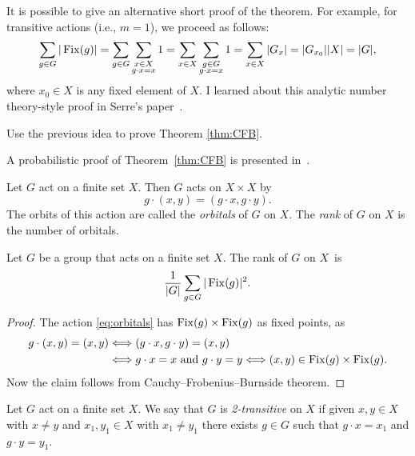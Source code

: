 It is possible to give an alternative short proof of the theorem. For example, 
for transitive actions (i.e., $m=1$), we proceed as follows:
\[
\sum_{g\in G}|\operatorname{Fix}(g)|=\sum_{g\in G}\sum_{\substack{x\in X\\g\cdot x=x}}1
=\sum_{x\in X}\sum_{\substack{g\in G\\g\cdot x=x}}1
=\sum_{x\in X}|G_x|=|G_{x_0}||X|=|G|,
\]
where $x_0\in X$ is any fixed element of $X$. I learned about this analytic number theory-style proof in Serre’s paper~\cite{MR1997347}.

\begin{exercise}
\label{xca:CFB}
    Use the previous idea to prove Theorem \ref{thm:CFB}. 
\end{exercise}

A probabilistic proof of Theorem~\ref{thm:CFB} is presented in~\cite{MR4043987}.

Let $G$ act on a finite set $X$. Then $G$ acts
on $X\times X$ by
\begin{equation}
    \label{eq:orbitals}
    g\cdot (x,y)=(g\cdot x,g\cdot y).
\end{equation}
The orbits of this action are called
the \emph{orbitals} of $G$ on $X$. The \emph{rank} 
of $G$ on $X$ is the number of orbitals. 

\begin{proposition}
    Let $G$ be a group that acts on a finite set $X$.
    The rank of $G$ on $X$~is 
    \[
    \frac{1}{|G|}\sum_{g\in G}|\operatorname{Fix}(g)|^2.
    \]
\end{proposition}

\begin{proof}
    The action \eqref{eq:orbitals} has 
    $\operatorname{Fix}(g)\times\operatorname{Fix}(g)$ as fixed points, as 
    \begin{align*}
        g\cdot (x,y)=(x,y)&\Longleftrightarrow
        (g\cdot x,g\cdot y)=(x,y)\\
        &\Longleftrightarrow g\cdot x=x\text{ and }g\cdot y=y\Longleftrightarrow
        (x,y)\in\operatorname{Fix}(g)\times\operatorname{Fix}(g).
    \end{align*}
    Now the claim follows from Cauchy--Frobenius--Burnside theorem. 
\end{proof}

\begin{definition}
    Let $G$ act on a finite set $X$. 
    We say that $G$ is \emph{2-transitive} on $X$ 
    if given $x,y\in X$ with $x\ne y$ and 
    $x_1,y_1\in X$ with $x_1\ne y_1$ there exists 
    $g\in G$ such that $g\cdot x=x_1$ and $g\cdot y=y_1$. 
\end{definition}

